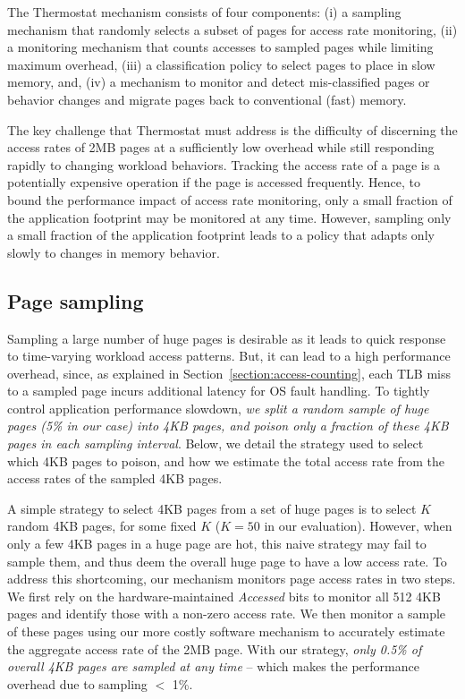 The Thermostat mechanism consists of four components: (i) a sampling mechanism
that randomly selects a subset of pages for access rate monitoring, (ii) a monitoring
mechanism that counts accesses to sampled pages while limiting maximum overhead, 
(iii) a classification policy to select pages to place in slow memory, and,
(iv) a mechanism to monitor and detect mis-classified pages or behavior changes and migrate 
pages back to conventional (fast) memory.

The key challenge that Thermostat must address is the difficulty of discerning the access 
rates of 2MB pages at a sufficiently low overhead while still responding rapidly
to changing workload behaviors. Tracking the access rate of a page
is a potentially expensive operation if the page is accessed frequently.  
Hence, to bound the performance impact of
access rate monitoring, only a small fraction of the application footprint may be
monitored at any time.  However, sampling only a small fraction of the application
footprint leads to a policy that adapts only slowly to changes in memory behavior.

\subsection{Page sampling}
\label{page-sampling}
Sampling a large number of huge pages is desirable as it leads to quick
response to time-varying workload access patterns. But, it can lead to a
high performance overhead, since, as explained in
Section~\ref{section:access-counting}, each TLB miss to a sampled page incurs additional
latency for OS fault handling. To tightly control application performance
slowdown, {\it we split a random sample of huge pages (5\% in our case)
into 4KB pages, and poison only a fraction of these 4KB pages in each sampling interval}.
Below, we detail the strategy used to select which 4KB pages to poison, and how
we estimate the total access rate from the access rates of the sampled 4KB
pages.

A simple strategy to select 4KB pages from a set of huge pages is to select $K$
random 4KB pages, for some fixed $K$ ($K = 50$ in our evaluation). However, when only a few 4KB
pages in a huge page are hot, this naive strategy may fail to sample them, and
thus deem the overall huge page to have a low access rate. To address this shortcoming, 
our mechanism monitors page access rates in two steps.
We first rely on the hardware-maintained {\it Accessed} bits to monitor all 512 4KB pages
and identify those with a  non-zero access rate.  We then monitor a sample of these 
pages using our more costly
software mechanism to accurately estimate the aggregate access rate of 
the 2MB page. With our strategy, {\it only 0.5\% of overall 4KB pages are
sampled at any time} -- which makes the performance overhead due to sampling
$<$ 1\%.

